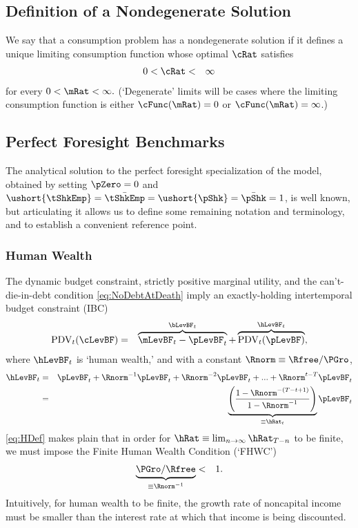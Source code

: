 \documentclass[titlepage]{\econtex}\providecommand{\texname}{BufferStockTheory}%
\begin{document}
\subsection{Definition of a Nondegenerate Solution}

We say that a consumption problem has a nondegenerate solution if it
defines a unique limiting consumption function whose optimal
$\cRat$ satisfies
\begin{eqnarray}
  0 & < \cRat < & \infty
\end{eqnarray}
for every $0 < \mRat < \infty.$ (`Degenerate' limits will be cases
where the limiting consumption function is either $\cFunc(\mRat)=0$ or $\cFunc(\mRat)=\infty$.)


\subsection{Perfect Foresight Benchmarks}

The analytical solution to the perfect foresight specialization of the model, obtained by setting $\pZero=0$ and $\ushort{\tShkEmp}=\bar{\tShkEmp}=\ushort{\pShk}=\bar{\pShk}=1$, is well known, but articulating it allows us to define some remaining notation and terminology, and to establish a convenient reference point.

\hypertarget{Human-Wealth}{}
\subsubsection{Human Wealth}
The dynamic budget constraint, strictly positive marginal utility, and the can't-die-in-debt condition \eqref{eq:NoDebtAtDeath} imply an exactly-holding intertemporal budget constraint (IBC)
\begin{eqnarray}
  \text{PDV}_{t}(\cLevBF) & = & \overbrace{\mLevBF_{t}-\pLevBF_{t}}^{\bLevBF_{t}}+\overbrace{\text{PDV}_{t}(\pLevBF)}^{\hLevBF_{t}}, \label{eq:IBCFinite}
\end{eqnarray}
where $\hLevBF_{t}$ is `human wealth,' and with a constant $\Rnorm \equiv \Rfree/\PGro$,
\begin{eqnarray}
  \hLevBF_{t} &  = & \pLevBF_{t}+\Rnorm^{-1} \pLevBF_{t} + \Rnorm^{-2} \pLevBF_{t} + ... + \Rnorm^{t-T} \pLevBF_{t} \notag
\\ & = & \underbrace{\left(\frac{1-\Rnorm^{-(T-t+1)}}{1-\Rnorm^{-1}}\right)}_{\equiv \hRat_{t}}\pLevBF_{t} \label{eq:HDef}
\end{eqnarray}
\eqref{eq:HDef} makes plain that in order for $\hRat \equiv \lim_{n \rightarrow
  \infty} \hRat_{T-n}$ to be finite, we must
impose the Finite Human Wealth Condition (`FHWC')
\begin{eqnarray}
  \underbrace{\PGro/\Rfree}_{\equiv \Rnorm^{-1}} & < & 1 \label{eq:FHWC}.
\end{eqnarray}
Intuitively, for human wealth to be finite, the growth rate of noncapital income must be smaller than
the interest rate at which that income is being discounted.
\end{document}
